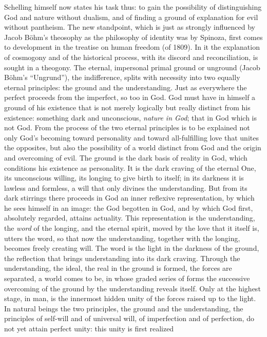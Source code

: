 Schelling himself now states his task thus: to gain the
possibility of distinguishing God and nature without dualism, and of
finding a ground of explanation for evil without pantheism. The new
standpoint, which is just as strongly influenced by Jacob Böhm's
theosophy as the philosophy of identity was by Spinoza, first comes to
development in the treatise on human freedom (of 1809). In it the
explanation of cosmogony and of the historical process, with its discord
and reconciliation, is sought in a theogony. The eternal, impersonal
primal ground or unground (Jacob Böhm's ``Ungrund''), the indifference,
splits with necessity into two equally eternal principles: the ground and
the understanding. Just as everywhere the perfect proceeds from the
imperfect, so too in God. God must have in himself a ground of his
existence that is not merely logically but really distinct from his
existence: something dark and unconscious, \emph{nature in God}; that in
God which is not God. From the process of the two eternal principles is
to be explained not only God's becoming toward personality and toward
all-fulfilling love that unites the opposites, but also the possibility
of a world distinct from God and the origin and overcoming of evil. The
ground is the dark basis of reality in God, which conditions his
existence as personality. It is the dark craving of the eternal One, its
unconscious willing, its longing to give birth to itself; in its
darkness it is lawless and formless, a will that only divines the
understanding. But from its dark stirrings there proceeds in God an inner
reflexive representation, by which he sees himself in an image: the God
begotten in God, and by which God first, absolutely regarded, attains
actuality. This representation is the understanding, the \emph{word} of
the longing, and the eternal spirit, moved by the love that it itself is,
utters the word, so that now the understanding, together with the
longing, becomes freely creating will. The word is the light in the
darkness of the ground, the reflection that brings understanding into its
dark craving. Through the understanding, the ideal, the real in the
ground is formed, the forces are separated, a world comes to be, in whose
graded series of forms the successive overcoming of the ground
by the understanding reveals itself. Only at the highest stage, in man,
is the innermost hidden unity of the forces raised up to the light. In
natural beings the two principles, the ground and the understanding, the
principles of self-will and of universal will, of imperfection and of
perfection, do not yet attain perfect unity: this unity is first realized
